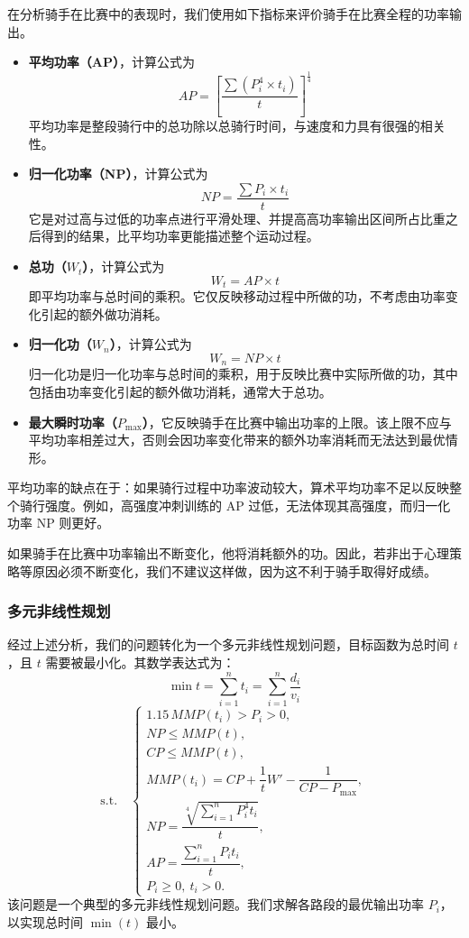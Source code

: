 \documentclass[11pt,a4paper]{ctexart}
\begin{document}
在分析骑手在比赛中的表现时，我们使用如下指标来评价骑手在比赛全程的功率输出。

\begin{itemize}
\item \textbf{平均功率（AP）}，计算公式为
\[
AP=\left[\frac{\sum\left(P_i^{4}\times t_i\right)}{t}\right]^{\frac{1}{4}}
\]
平均功率是整段骑行中的总功除以总骑行时间，与速度和力具有很强的相关性。

\item \textbf{归一化功率（NP）}，计算公式为
\[
NP=\frac{\sum P_i\times t_i}{t}
\]
它是对过高与过低的功率点进行平滑处理、并提高高功率输出区间所占比重之后得到的结果，比平均功率更能描述整个运动过程。

\item \textbf{总功（$W_t$）}，计算公式为
\[
W_t=AP\times t
\]
即平均功率与总时间的乘积。它仅反映移动过程中所做的功，不考虑由功率变化引起的额外做功消耗。

\item \textbf{归一化功（$W_n$）}，计算公式为
\[
W_n=NP\times t
\]
归一化功是归一化功率与总时间的乘积，用于反映比赛中实际所做的功，其中包括由功率变化引起的额外做功消耗，通常大于总功。

\item \textbf{最大瞬时功率（$P_{\max}$）}，它反映骑手在比赛中输出功率的上限。该上限不应与平均功率相差过大，否则会因功率变化带来的额外功率消耗而无法达到最优情形。
\end{itemize}

平均功率的缺点在于：如果骑行过程中功率波动较大，算术平均功率不足以反映整个骑行强度。例如，高强度冲刺训练的 AP 过低，无法体现其高强度，而归一化功率 NP 则更好。

如果骑手在比赛中功率输出不断变化，他将消耗额外的功。因此，若非出于心理策略等原因必须不断变化，我们不建议这样做，因为这不利于骑手取得好成绩。

\subsubsection{多元非线性规划}

经过上述分析，我们的问题转化为一个多元非线性规划问题，目标函数为总时间 $t$，且 $t$ 需要被最小化。其数学表达式为：
\[
\min t=\sum_{i=1}^{n}t_i=\sum_{i=1}^{n}\frac{d_i}{v_i}
\]
\[
\text{s.t.}\quad
\begin{cases}
1.15\,MMP(t_i)>P_i>0,\\[0.3em]
NP\leqslant MMP(t),\\[0.3em]
CP\leqslant MMP(t),\\[0.3em]
MMP(t_i)=CP+\dfrac{1}{t}W'-\dfrac{1}{CP-P_{\max}},\\[0.6em]
NP=\dfrac{\sqrt[4]{\sum_{i=1}^{n}P_i^{4}t_i}}{t},\\[0.6em]
AP=\dfrac{\sum_{i=1}^{n}P_it_i}{t},\\[0.6em]
P_i\geqslant 0,\ t_i>0.
\end{cases}
\]
该问题是一个典型的多元非线性规划问题。我们求解各路段的最优输出功率 $P_i$，以实现总时间 $\min(t)$ 最小。
\end{document}
